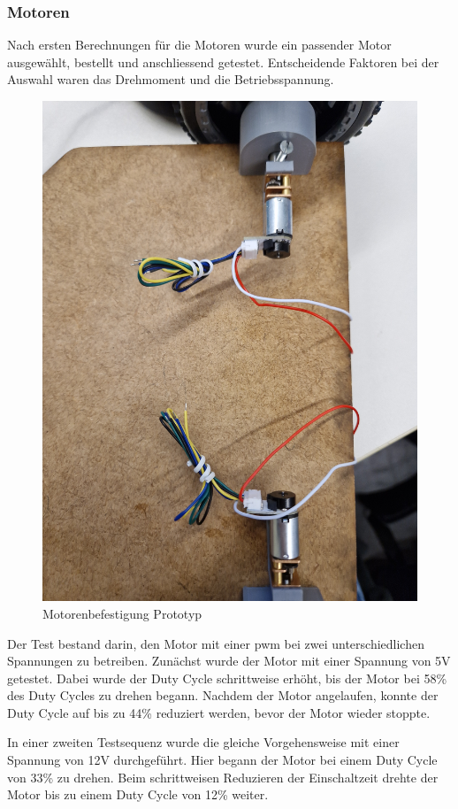 \subsubsection*{Motoren}


Nach ersten Berechnungen für die Motoren wurde ein passender Motor ausgewählt, bestellt und anschliessend getestet. Entscheidende Faktoren bei der Auswahl waren das Drehmoment und die Betriebsspannung.

\begin{figure}[H]
    \centering
    \includegraphics[width=0.8\linewidth]{img/Motorenaufbau.jpg}
    \caption{Motorenbefestigung Prototyp}
    \label{fig:Motorenaufbau}
\end{figure}

Der Test bestand darin, den Motor mit einer \acrfull{pwm} bei zwei unterschiedlichen Spannungen zu betreiben. Zunächst wurde der Motor mit einer Spannung von 5V getestet. Dabei wurde der Duty Cycle schrittweise erhöht, bis der Motor bei 58\% des Duty Cycles zu drehen begann. Nachdem der Motor angelaufen, konnte der Duty Cycle auf bis zu 44\% reduziert werden, bevor der Motor wieder stoppte.

In einer zweiten Testsequenz wurde die gleiche Vorgehensweise mit einer Spannung von 12V durchgeführt. Hier begann der Motor bei einem Duty Cycle von 33\% zu drehen. Beim schrittweisen Reduzieren der Einschaltzeit drehte der Motor bis zu einem Duty Cycle von 12\% weiter.

